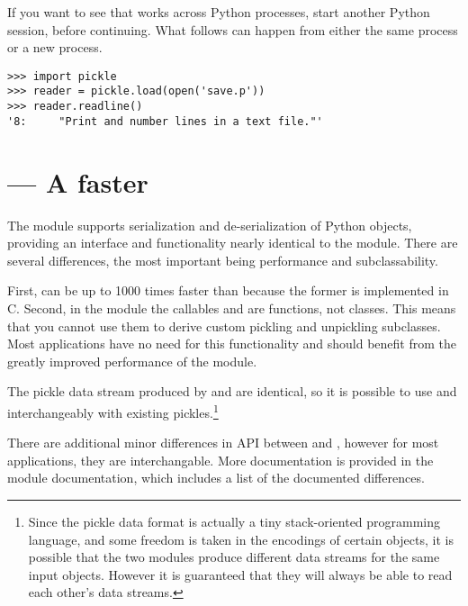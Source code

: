 If you want to see that  works across Python
processes, start another Python session, before continuing.  What
follows can happen from either the same process or a new process.

\begin{verbatim}
>>> import pickle
>>> reader = pickle.load(open('save.p'))
>>> reader.readline()
'8:     "Print and number lines in a text file."'
\end{verbatim}


\begin{seealso}



\end{seealso}


\section{ --- A faster }


The  module supports serialization and
de-serialization of Python objects, providing an interface and
functionality nearly identical to the
 module.  There are several
differences, the most important being performance and subclassability.

First,  can be up to 1000 times faster than
 because the former is implemented in C.  Second, in
the  module the callables  and
 are functions, not classes.  This means that
you cannot use them to derive custom pickling and unpickling
subclasses.  Most applications have no need for this functionality and
should benefit from the greatly improved performance of the
 module.

The pickle data stream produced by  and
 are identical, so it is possible to use
 and  interchangeably with existing
pickles.\footnote{Since the pickle data format is actually a tiny
stack-oriented programming language, and some freedom is taken in the
encodings of certain objects, it is possible that the two modules
produce different data streams for the same input objects.  However it
is guaranteed that they will always be able to read each other's
data streams.}

There are additional minor differences in API between 
and , however for most applications, they are
interchangable.  More documentation is provided in the
 module documentation, which
includes a list of the documented differences.


